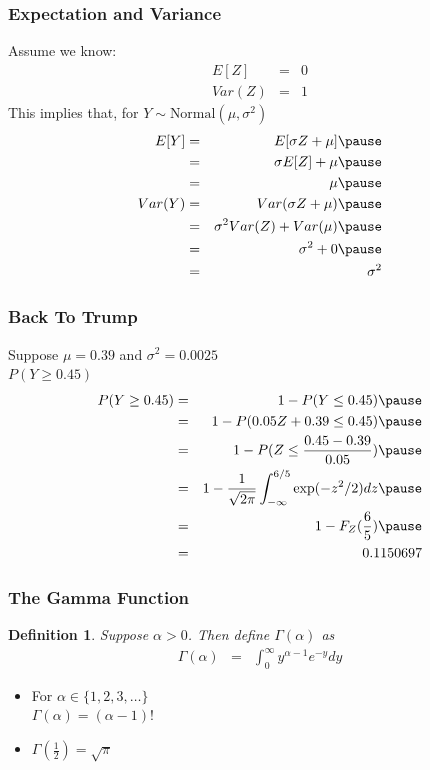\documentclass{beamer}
\newtheorem{defn}{Definition}
\numberwithin{equation}{section}
\begin{document}
\begin{frame}
\frametitle{Expectation and Variance}

Assume we know:
\begin{eqnarray}
E[Z]  & = & 0 \nonumber \\
Var(Z) & = & 1 \nonumber 
\end{eqnarray}
\pause 
This implies that, for $Y \sim \text{Normal}(\mu, \sigma^2)$ \pause 
\begin{eqnarray} 
E[Y] & = & E[\sigma Z + \mu] \nonumber  \pause \\
& = & \sigma E[Z] + \mu \nonumber  \pause \\
& = & \mu \nonumber \pause \\
Var(Y) & = & Var(\sigma Z + \mu) \nonumber \pause \\
& = & \sigma^2 Var(Z) + Var(\mu) \nonumber  \pause \\
& = & \sigma^2 + 0 \nonumber \pause \\
 & =& \sigma^2 \nonumber 
\end{eqnarray}

\end{frame}





\begin{frame}
\frametitle{Back To Trump} 

Suppose $\mu = 0.39$ and $\sigma^2 = 0.0025$ \pause  \\
$P(Y\geq 0.45)$  \pause 
\begin{eqnarray} 
P(Y \geq 0.45)  &  = & 1 - P(Y \leq 0.45 ) \nonumber \pause  \\
& = &  1 - P(0.05 Z + 0.39 \leq  0.45)   \nonumber  \pause\\
& = & 1 - P(Z \leq \frac{0.45-0.39 }{0.05} ) \nonumber \pause \\
& = & 1 - \frac{1}{\sqrt{2\pi} } \int_{-\infty}^{6/5} \exp(-z^2/2) dz \pause   \nonumber \\
& = & 1 - F_{Z} (\frac{6}{5} ) \nonumber \pause\\
& = & 0.1150697 \nonumber 
\end{eqnarray}
\end{frame}

\begin{frame}
\frametitle{The Gamma Function}

\begin{defn}
Suppose $\alpha>0$.  Then define $\Gamma(\alpha)$ as 
\begin{eqnarray}
\Gamma(\alpha) & = & \int_{0}^{\infty} y^{\alpha- 1} e^{-y} dy \nonumber 
\end{eqnarray}
\end{defn}

\begin{itemize}
\item[-] For $\alpha \in \{1, 2, 3, \hdots\}$\\
 $\Gamma(\alpha) = (\alpha- 1)!$
\item[-] $\Gamma(\frac{1}{2}) = \sqrt{\pi}$
\end{itemize}


\end{frame}
\end{document}
